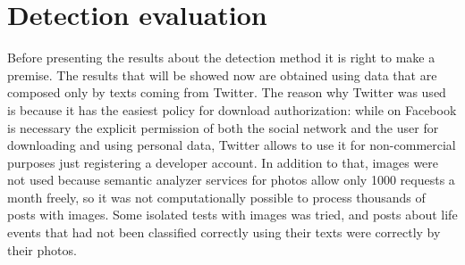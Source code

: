 \section{Detection evaluation}
\label{sec:detectioneva}
\noindent
\renewcommand\arraystretch{1.5}
\setlength\tabcolsep{0pt}
\begin{table}
\centering
{}
\quad
{}
\caption{Confusion matrices of boolean tests}
\end{table}
Before presenting the results about the detection method it is right to make a premise. The results that will be showed now are obtained using data that are composed only by texts coming from Twitter. The reason why Twitter was used is because it has the easiest policy for download authorization: while on Facebook is necessary the explicit permission of both the social network and the user for downloading and using personal data, Twitter allows to use it for non-commercial purposes just registering a developer account. In addition to that, images were not used because semantic analyzer services for photos allow only 1000 requests a month freely, so it was not computationally possible to process thousands of posts with images. Some isolated tests with images was tried, and posts about life events that had not been classified correctly using their texts were correctly by their photos.

